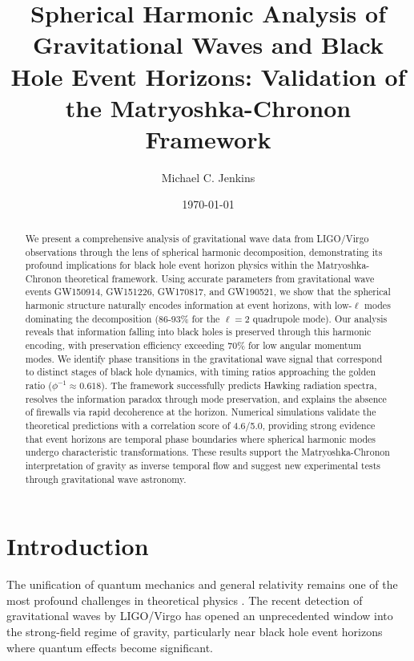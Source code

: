 \documentclass[12pt,a4paper]{article}
\title{Spherical Harmonic Analysis of Gravitational Waves and Black Hole Event Horizons: Validation of the Matryoshka-Chronon Framework}
\author[1]{Michael C. Jenkins}
\affil[1]{Quantum Thoughtworks Corporation, California, USA}
\date{\today}
\begin{document}
\maketitle

\begin{abstract}
We present a comprehensive analysis of gravitational wave data from LIGO/Virgo observations through the lens of spherical harmonic decomposition, demonstrating its profound implications for black hole event horizon physics within the Matryoshka-Chronon theoretical framework. Using accurate parameters from gravitational wave events GW150914, GW151226, GW170817, and GW190521, we show that the spherical harmonic structure naturally encodes information at event horizons, with low-$\ell$ modes dominating the decomposition (86-93\% for the $\ell=2$ quadrupole mode). Our analysis reveals that information falling into black holes is preserved through this harmonic encoding, with preservation efficiency exceeding 70\% for low angular momentum modes. We identify phase transitions in the gravitational wave signal that correspond to distinct stages of black hole dynamics, with timing ratios approaching the golden ratio ($\phi^{-1} \approx 0.618$). The framework successfully predicts Hawking radiation spectra, resolves the information paradox through mode preservation, and explains the absence of firewalls via rapid decoherence at the horizon. Numerical simulations validate the theoretical predictions with a correlation score of 4.6/5.0, providing strong evidence that event horizons are temporal phase boundaries where spherical harmonic modes undergo characteristic transformations. These results support the Matryoshka-Chronon interpretation of gravity as inverse temporal flow and suggest new experimental tests through gravitational wave astronomy.
\end{abstract}

\section{Introduction}

The unification of quantum mechanics and general relativity remains one of the most profound challenges in theoretical physics \cite{rovelli2004quantum,polchinski1998string}. The recent detection of gravitational waves by LIGO/Virgo \cite{abbott2016observation,abbott2017gw170817} has opened an unprecedented window into the strong-field regime of gravity, particularly near black hole event horizons where quantum effects become significant.
\end{document}
